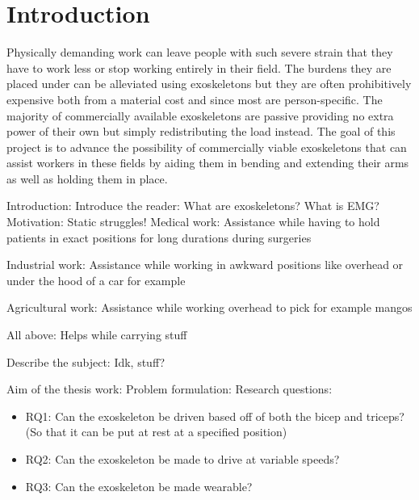 \section{Introduction}
\label{section:intro}

Physically demanding work can leave people with such severe strain that they have to work less or stop working entirely in 
their field\cite{WorkDemands}. The burdens they are placed under can be alleviated using exoskeletons but they are often 
prohibitively expensive both from a material cost and since most are person-specific. The majority of commercially available 
exoskeletons are passive providing no extra power of their own but simply redistributing the load instead. The goal of this 
project is to advance the possibility of commercially viable exoskeletons that can assist workers in these fields by aiding 
them in bending and extending their arms as well as holding them in place.

Introduction:
    Introduce the reader:
        What are exoskeletons?
        What is EMG?
    Motivation:
        Static struggles!
            Medical work:
                Assistance while having to hold patients in exact positions for long durations during surgeries

            Industrial work:
                Assistance while working in awkward positions like overhead or under the hood of a car for example

            Agricultural work:
                Assistance while working overhead to pick for example mangos
            
            All above:
                Helps while carrying stuff

    Describe the subject:
        Idk, stuff?

    Aim of the thesis work:
        Problem formulation: %
            Research questions:
            \begin{itemize}
                 
                \item RQ1: Can the exoskeleton be driven based off of both the bicep and triceps? (So that it can be put at rest at a specified position)
                
                \item RQ2: Can the exoskeleton be made to drive at variable speeds?
                
                \item RQ3: Can the exoskeleton be made wearable?
            \end{itemize}

